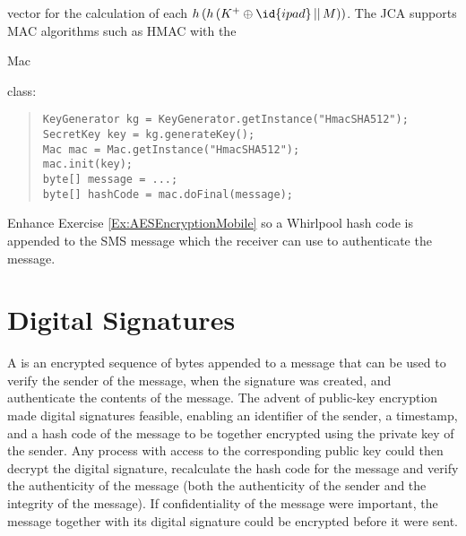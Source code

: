 vector for the calculation of each $h\left(h\left(K^+\oplus\id{ipad} \,||\, M\right)\right)$.
The JCA supports MAC algorithms such as HMAC with the \begin{code}Mac\end{code} class:
\begin{quote}\begin{code}\begin{verbatim}
KeyGenerator kg = KeyGenerator.getInstance("HmacSHA512");
SecretKey key = kg.generateKey();
Mac mac = Mac.getInstance("HmacSHA512");
mac.init(key);
byte[] message = ...;
byte[] hashCode = mac.doFinal(message);
\end{verbatim}\end{code}\end{quote}


\begin{exercise}
  Enhance Exercise \ref{Ex:AESEncryptionMobile} so a Whirlpool hash code is appended
  to the SMS message which the receiver can use to authenticate the message.
\end{exercise}



\section{Digital Signatures}\label{Se:DigitalSignatures}


A  is an encrypted sequence of bytes appended to a message
that can be used to verify the sender of the message, when the signature was created,
and authenticate the contents of the message.
The advent of public-key encryption made digital signatures feasible, enabling
an identifier of the sender, a timestamp, and a hash code of the message to be together
encrypted using the private key of the sender.
Any process with access to the corresponding public key could then decrypt the digital
signature, recalculate the hash code for the message and verify the authenticity
of the message (both the authenticity of the sender and the integrity of the message).
If confidentiality of the message were important, the message together with its
digital signature could be encrypted before it were sent.

